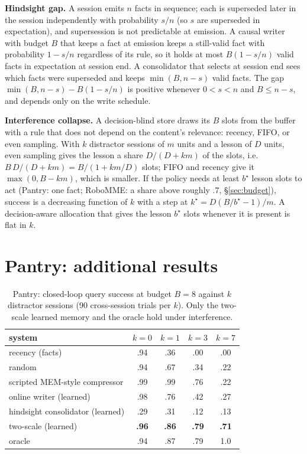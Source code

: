 \documentclass{article}
\begin{document}
\textbf{Hindsight gap.} A session emits $n$ facts in sequence; each is superseded later in the session independently with probability $s/n$ (so $s$ are superseded in expectation), and supersession is not predictable at emission. A causal writer with budget $B$ that keeps a fact at emission keeps a still-valid fact with probability $1-s/n$ regardless of its rule, so it holds at most $B(1-s/n)$ valid facts in expectation at session end. A consolidator that selects at session end sees which facts were superseded and keeps $\min(B,n-s)$ valid facts. The gap $\min(B,n-s)-B(1-s/n)$ is positive whenever $0<s<n$ and $B\le n-s$, and depends only on the write schedule.

\textbf{Interference collapse.} A decision-blind store draws its $B$ slots from the buffer with a rule that does not depend on the content's relevance: recency, FIFO, or even sampling. With $k$ distractor sessions of $m$ units and a lesson of $D$ units, even sampling gives the lesson a share $D/(D+km)$ of the slots, i.e. $B\,D/(D+km)=B/(1+km/D)$ slots; FIFO and recency give it $\max(0,B-km)$, which is smaller. If the policy needs at least $b^\star$ lesson slots to act (Pantry: one fact; RoboMME: a share above roughly $.7$, \S\ref{sec:budget}), success is a decreasing function of $k$ with a step at $k^\star=D(B/b^\star-1)/m$. A decision-aware allocation that gives the lesson $b^\star$ slots whenever it is present is flat in $k$.

\section{Pantry: additional results}
\label{app:pantry}

\begin{table}[h]
\centering\small
\caption{Pantry: closed-loop query success at budget $B{=}8$ against $k$ distractor sessions (90 cross-session trials per $k$). Only the two-scale learned memory and the oracle hold under interference.}
\label{tab:pantry}
\setlength{\tabcolsep}{5pt}
\begin{tabular}{lcccc}
\toprule
system & $k{=}0$ & $k{=}1$ & $k{=}3$ & $k{=}7$\\
\midrule
recency (facts) & .94 & .36 & .00 & .00\\
random & .94 & .67 & .34 & .22\\
scripted MEM-style compressor & .99 & .99 & .76 & .22\\
online writer (learned) & .98 & .76 & .42 & .27\\
hindsight consolidator (learned) & .29 & .31 & .12 & .13\\
two-scale (learned) & \textbf{.96} & \textbf{.86} & \textbf{.79} & \textbf{.71}\\
oracle & .94 & .87 & .79 & 1.0\\
\bottomrule
\end{tabular}
\end{table}
\end{document}
